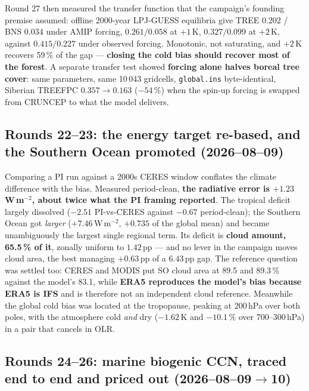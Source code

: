 \documentclass[10pt]{article}
\begin{document}
Round 27 then measured the transfer function that the campaign's founding premise assumed:
offline 2000-year LPJ-GUESS equilibria give TREE $0.202$ / BNS $0.034$ under AMIP forcing,
$0.261/0.058$ at $+1$\,K, $0.327/0.099$ at $+2$\,K, against $0.415/0.227$ under observed
forcing. Monotonic, not saturating, and $+2$\,K recovers 59\,\% of the gap ---
\textbf{closing the cold bias should recover most of the forest}. A separate transfer test
showed \textbf{forcing alone halves boreal tree cover}: same parameters, same 10\,043
gridcells, \texttt{global.ins} byte-identical, Siberian TREEFPC $0.357\to0.163$ ($-54\,\%$)
when the spin-up forcing is swapped from CRUNCEP to what the model delivers.

\subsection{Rounds 22--23: the energy target re-based, and the Southern Ocean promoted
(2026--08--09)}

Comparing a PI run against a 2000s CERES window conflates the climate difference with the
bias. Measured period-clean, \textbf{the radiative error is $+1.23$\,W\,m$^{-2}$, about
twice what the PI framing reported}. The tropical deficit largely dissolved ($-2.51$
PI-vs-CERES against $-0.67$ period-clean); the Southern Ocean got \emph{larger}
($+7.46$\,W\,m$^{-2}$, $+0.735$ of the global mean) and became unambiguously the largest
single regional term. Its deficit is \textbf{cloud amount, 65.5\,\% of it}, zonally uniform
to $1.42$\,pp --- and no lever in the campaign moves cloud area, the best managing
$+0.63$\,pp of a $6.43$\,pp gap. The reference question was settled too: CERES and MODIS put
SO cloud area at 89.5 and 89.3\,\% against the model's 83.1, while \textbf{ERA5 reproduces
the model's bias because ERA5 is IFS} and is therefore not an independent cloud reference.
Meanwhile the global cold bias was located at the tropopause, peaking at 200\,hPa over both
poles, with the atmosphere cold \emph{and} dry ($-1.62$\,K and $-10.1\,\%$ over
700--300\,hPa) in a pair that cancels in OLR.

\subsection{Rounds 24--26: marine biogenic CCN, traced end to end and priced out
(2026--08--09$\to$10)}
\end{document}
